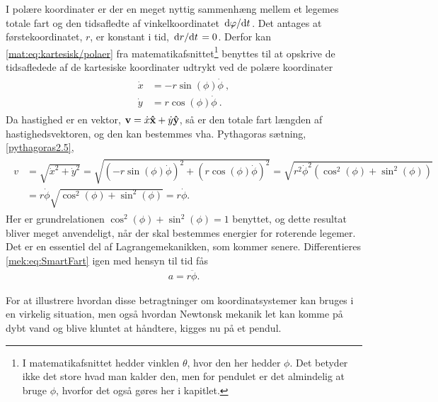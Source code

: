 I polære koordinater er der en meget nyttig sammenhæng mellem et legemes totale fart og den tidsafledte af vinkelkoordinatet $\dv*{\varphi}{t}$. Det antages at førstekoordinatet, $r$, er konstant i tid, $\dv*{r}{t} = 0$. Derfor kan \cref{mat:eq:kartesisk/polaer} fra matematikafsnittet\footnote{I matematikafsnittet hedder vinklen $\theta$, hvor den her hedder $\phi$. Det betyder ikke det store hvad man kalder den, men for pendulet er det almindelig at bruge $\phi$, hvorfor det også gøres her i kapitlet.} benyttes til at opskrive de tidsafledede af de kartesiske koordinater udtrykt ved de polære koordinater
%
\begin{align}
\begin{aligned}
	\dot{x} &= -r\sin(\phi)\dot{\phi} \: , \\
	\dot{y} &= r\cos(\phi)\dot{\phi} \: .
\end{aligned}
\end{align}
%
Da hastighed er en vektor, $\vb{v} = \dot{x} \vu{x} + \dot{y} \vu{y}$, så er den totale fart længden af hastighedsvektoren, og den kan bestemmes vha. Pythagoras sætning, \cref{pythagoras2.5},
%
\begin{align} \label{mek:eq:SmartFart}
\begin{aligned}
	v &= \sqrt{\dot{x}^2 + \dot{y}^2} = \sqrt{(-r\sin(\phi)\dot{\phi})^2 + (r\cos(\phi)\dot{\phi})^2} = \sqrt{r^2\dot{\phi}^2 \left(\cos^2(\phi) + \sin^2(\phi) \right)} \\
	&= r\dot{\phi}\sqrt{\cos^2(\phi) + \sin^2(\phi)} = r\dot{\phi}.
\end{aligned}
\end{align}
%
Her er grundrelationen $\cos^2(\phi) + \sin^2(\phi) = 1$ benyttet, og dette resultat bliver meget anvendeligt, når der skal bestemmes energier for roterende legemer. Det er en essentiel del af Lagrangemekanikken, som kommer senere. Differentieres \cref{mek:eq:SmartFart} igen med hensyn til tid fås
%
\begin{align} \label{mek:eq:vinkelacceleration}
	a = r\ddot{\phi}.
\end{align}

For at illustrere hvordan disse betragtninger om koordinatsystemer kan bruges i en virkelig situation, men også hvordan Newtonsk mekanik let kan komme på dybt vand og blive kluntet at håndtere, kigges nu på et pendul.
